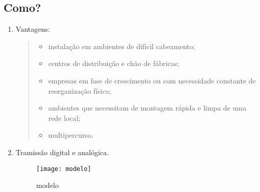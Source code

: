 \documentclass{beamer}
\begin{document}

\begin{frame}

\subsection{Como?}	

   \begin{enumerate}

      \item {Vantagens:}

	 \begin{quote}

	 \begin{itemize}

	       \item instalação em ambientes de difícil cabeamento;

	       \item centros de distribuição e chão de fábricas;

	       \item empresas em fase de crescimento ou com necessidade constante de reorganização física;

	       \item ambientes que necessitam de montagem rápida e limpa de uma rede local;

	       \item multipercurso.

	 \end{itemize}

	 \end{quote}

      \item Tramissão digital e analógica.

	 \begin{figure}[t]

	 \centering

	 \texttt{[image: modelo]}

	 \caption{modelo}

	 \label{fig:modelo}

	 \end{figure}

      

      \end{enumerate}	      

\end{frame}
\end{document}
